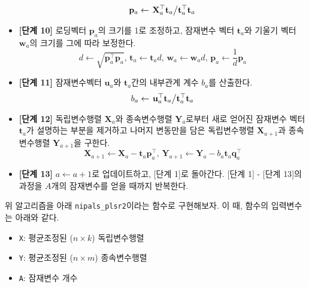 \documentclass[]{book}
\providecommand{\tightlist}{%
  \setlength{\itemsep}{0pt}\setlength{\parskip}{0pt}}
\begin{document}
\begin{itemize}
  \[\mathbf{p}_a \leftarrow \left. \mathbf{X}_a^\top \mathbf{t}_a \middle/ \mathbf{t}_a^\top \mathbf{t}_a \right.\]
\item
  \textbf{{[}단계 10{]}} 로딩벡터 \(\mathbf{p}_a\)의 크기를 1로 조정하고, 잠재변수 벡터 \(\mathbf{t}_a\)와 기울기 벡터 \(\mathbf{w}_a\)의 크기를 그에 따라 보정한다.
  \[d \leftarrow \sqrt{\mathbf{p}_a^\top \mathbf{p}_a}, \, \mathbf{t}_a \leftarrow \mathbf{t}_a d, \, \mathbf{w}_a \leftarrow \mathbf{w}_a d, \, \mathbf{p}_a \leftarrow \frac{1}{d} \mathbf{p}_a \]
\item
  \textbf{{[}단계 11{]}} 잠재변수벡터 \(\mathbf{u}_a\)와 \(\mathbf{t}_a\)간의 내부관계 계수 \(b_a\)를 산출한다.
  \[b_a \leftarrow \left. \mathbf{u}_a^\top \mathbf{t}_a \middle/ \mathbf{t}_a^\top \mathbf{t}_a \right. \]
\item
  \textbf{{[}단계 12{]}} 독립변수행렬 \(\mathbf{X}_a\)와 종속변수행렬 \(\mathbf{Y}_a\)로부터 새로 얻어진 잠재변수 벡터 \(\mathbf{t}_a\)가 설명하는 부분을 제거하고 나머지 변동만을 담은 독립변수행렬 \(\mathbf{X}_{a + 1}\)과 종속변수행렬 \(\mathbf{Y}_{a + 1}\)을 구한다.
  \[\mathbf{X}_{a + 1} \leftarrow \mathbf{X}_a - \mathbf{t}_a \mathbf{p}_a^\top, \, \mathbf{Y}_{a + 1} \leftarrow \mathbf{Y}_a - b_a \mathbf{t}_a \mathbf{q}_a^\top \]
\item
  \textbf{{[}단계 13{]}} \(a \leftarrow a + 1\)로 업데이트하고, {[}단계 1{]}로 돌아간다. {[}단계 1{]} - {[}단계 13{]}의 과정을 \(A\)개의 잠재변수를 얻을 때까지 반복한다.
\end{itemize}

위 알고리즘을 아래 \texttt{nipals\_plsr2}이라는 함수로 구현해보자. 이 때, 함수의 입력변수는 아래와 같다.

\begin{itemize}
\tightlist
\item
  \texttt{X}: 평균조정된 (\(n \times k\)) 독립변수행렬
\item
  \texttt{Y}: 평균조정된 (\(n \times m\)) 종속변수행렬
\item
  \texttt{A}: 잠재변수 개수
\end{itemize}
\end{document}
